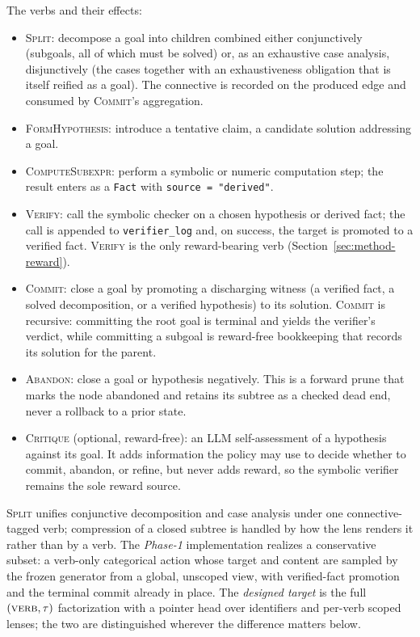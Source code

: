 The verbs and their effects:

\begin{itemize}[leftmargin=*, itemsep=0.2em]
  \item \textsc{Split}: decompose a goal into children combined either
        conjunctively (subgoals, all of which must be solved) or, as an
        exhaustive case analysis, disjunctively (the cases together with an
        exhaustiveness obligation that is itself reified as a goal). The
        connective is recorded on the produced edge and consumed by
        \textsc{Commit}'s aggregation.
  \item \textsc{FormHypothesis}: introduce a tentative claim, a candidate
        solution addressing a goal.
  \item \textsc{ComputeSubexpr}: perform a symbolic or numeric computation
        step; the result enters as a \texttt{Fact} with
        \texttt{source = "derived"}.
  \item \textsc{Verify}: call the symbolic checker on a chosen hypothesis or
        derived fact; the call is appended to \texttt{verifier\_log} and, on
        success, the target is promoted to a verified fact. \textsc{Verify}
        is the only reward-bearing verb (Section~\ref{sec:method-reward}).
  \item \textsc{Commit}: close a goal by promoting a discharging witness (a
        verified fact, a solved decomposition, or a verified hypothesis) to
        its solution. \textsc{Commit} is recursive: committing the root goal
        is terminal and yields the verifier's verdict, while committing a
        subgoal is reward-free bookkeeping that records its solution for the
        parent.
  \item \textsc{Abandon}: close a goal or hypothesis negatively. This is a
        forward prune that marks the node abandoned and retains its subtree
        as a checked dead end, never a rollback to a prior state.
  \item \textsc{Critique} (optional, reward-free): an LLM self-assessment of
        a hypothesis against its goal. It adds information the policy may use
        to decide whether to commit, abandon, or refine, but never adds
        reward, so the symbolic verifier remains the sole reward source.
\end{itemize}

\textsc{Split} unifies conjunctive decomposition and case analysis under one
connective-tagged verb; compression of a closed subtree is handled by how the
lens renders it rather than by a verb. The \emph{Phase-1} implementation
realizes a conservative subset: a verb-only categorical action whose target
and content are sampled by the frozen generator from a global, unscoped view,
with verified-fact promotion and the terminal commit already in place. The
\emph{designed target} is the full $(\textsc{verb}, \tau)$ factorization with a
pointer head over identifiers and per-verb scoped lenses; the two are
distinguished wherever the difference matters below.

